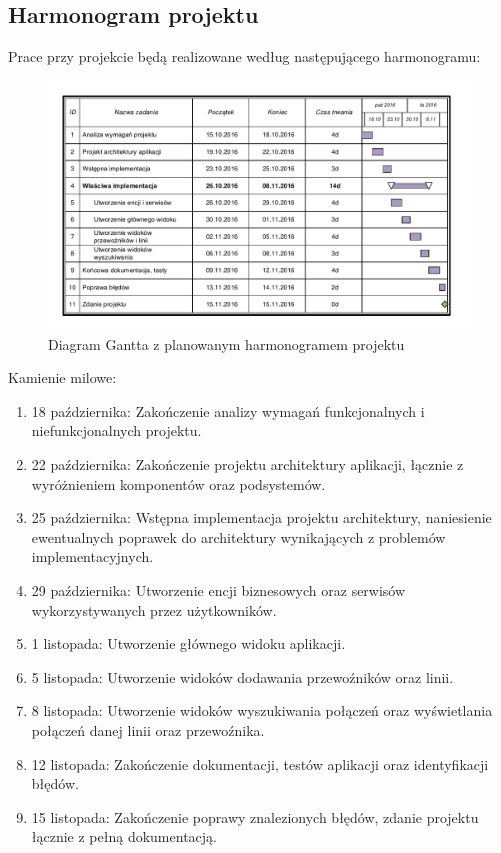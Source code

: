 \documentclass[10pt,a4paper]{article}
\begin{document}
\subsection{Harmonogram projektu}
Prace przy projekcie będą realizowane według następującego harmonogramu:
\begin{figure}[H]
	\centering
	\includegraphics[width=14cm]{gantt.pdf}
	\caption{Diagram Gantta z planowanym harmonogramem projektu}
\end{figure}
Kamienie milowe:
\begin{enumerate}
	\item 18 października: Zakończenie analizy wymagań funkcjonalnych i niefunkcjonalnych projektu.
	\item 22 października: Zakończenie projektu architektury aplikacji, łącznie z wyróżnieniem komponentów oraz podsystemów.
	\item 25 października: Wstępna implementacja projektu architektury, naniesienie ewentualnych poprawek do architektury wynikających z problemów implementacyjnych.
	\item 29 października: Utworzenie encji biznesowych oraz serwisów wykorzystywanych przez użytkowników.
	\item 1 listopada: Utworzenie głównego widoku aplikacji.
	\item 5 listopada: Utworzenie widoków dodawania przewoźników oraz linii.
	\item 8 listopada: Utworzenie widoków wyszukiwania połączeń oraz wyświetlania połączeń danej linii oraz przewoźnika.
	\item 12 listopada: Zakończenie dokumentacji, testów aplikacji oraz identyfikacji błędów.
	\item 15 listopada: Zakończenie poprawy znalezionych błędów, zdanie projektu łącznie z pełną dokumentacją.
\end{enumerate}
\end{document}
